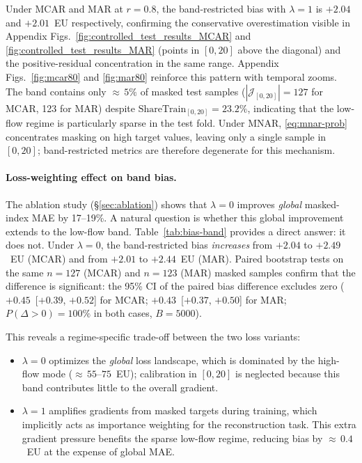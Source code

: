 Under MCAR and MAR at $r{=}0.8$, the band-restricted bias with $\lambda{=}1$ is $+2.04$ and $+2.01$~EU respectively, confirming the conservative overestimation visible in Appendix Figs.~\ref{fig:controlled_test_results_MCAR} and \ref{fig:controlled_test_results_MAR} (points in $[0,20]$ above the diagonal) and the positive-residual concentration in the same range. Appendix Figs.~\ref{fig:mcar80} and \ref{fig:mar80} reinforce this pattern with temporal zooms. The band contains only ${\approx}\,5\%$ of masked test samples ($|\mathcal{J}_{[0,20]}|{=}127$ for MCAR, 123 for MAR) despite $\mathrm{ShareTrain}_{[0,20]}{=}23.2\%$, indicating that the low-flow regime is particularly sparse in the test fold. Under MNAR, \eqref{eq:mnar-prob} concentrates masking on high target values, leaving only a single sample in $[0,20]$; band-restricted metrics are therefore degenerate for this mechanism.

\paragraph{Loss-weighting effect on band bias.}
The ablation study (\S\ref{sec:ablation}) shows that $\lambda{=}0$ improves \emph{global} masked-index MAE by 17--19\%. A natural question is whether this global improvement extends to the low-flow band. Table~\ref{tab:bias-band} provides a direct answer: it does not. Under $\lambda{=}0$, the band-restricted bias \emph{increases} from $+2.04$ to $+2.49$~EU (MCAR) and from $+2.01$ to $+2.44$~EU (MAR). Paired bootstrap tests on the same $n{=}127$ (MCAR) and $n{=}123$ (MAR) masked samples confirm that the difference is significant: the 95\% CI of the paired bias difference excludes zero ($+0.45$~[$+0.39$, $+0.52$] for MCAR; $+0.43$~[$+0.37$, $+0.50$] for MAR; $P(\Delta{>}0){=}100\%$ in both cases, $B{=}5000$).

This reveals a regime-specific trade-off between the two loss variants:
\begin{itemize}
  \item $\lambda{=}0$ optimizes the \emph{global} loss landscape, which is dominated by the high-flow mode (${\approx}\,55$--$75$~EU); calibration in $[0,20]$ is neglected because this band contributes little to the overall gradient.
  \item $\lambda{=}1$ amplifies gradients from masked targets during training, which implicitly acts as importance weighting for the reconstruction task. This extra gradient pressure benefits the sparse low-flow regime, reducing bias by ${\approx}\,0.4$~EU at the expense of global MAE.
\end{itemize}

